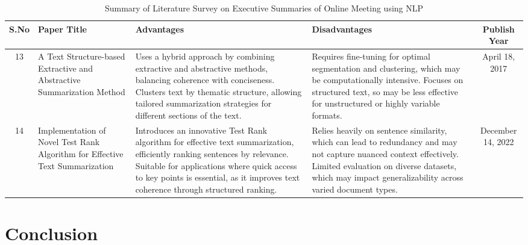 \documentclass{article}
\begin{document}
\newpage
\clearpage

\begin{table}[htp]
\centering
\renewcommand{\arraystretch}{1.5}
\begin{tabular}{|c|p{4cm}|p{4cm}|p{4cm}|c|}
\hline
\textbf{S.No} & \textbf{Paper Title} & \textbf{Advantages} & \textbf{Disadvantages} & \textbf{Publish Year} \\ \hline

13 & A Text Structure-based Extractive and Abstractive Summarization Method & Uses a hybrid approach by combining extractive and abstractive methods, balancing coherence with conciseness. Clusters text by thematic structure, allowing tailored summarization strategies for different sections of the text. & Requires fine-tuning for optimal segmentation and clustering, which may be computationally intensive. Focuses on structured text, so may be less effective for unstructured or highly variable formats. & April 18, 2017 \\ \hline

14 & Implementation of Novel Test Rank Algorithm for Effective Text Summarization & Introduces an innovative Test Rank algorithm for effective text summarization, efficiently ranking sentences by relevance. Suitable for applications where quick access to key points is essential, as it improves text coherence through structured ranking. & Relies heavily on sentence similarity, which can lead to redundancy and may not capture nuanced context effectively. Limited evaluation on diverse datasets, which may impact generalizability across varied document types. & December 14, 2022 \\ \hline


\end{tabular}
\caption{Summary of Literature Survey on Executive Summaries of Online Meeting using NLP }
\label{table:literature_survey}
\end{table}

\clearpage


\section{Conclusion}
\end{document}
